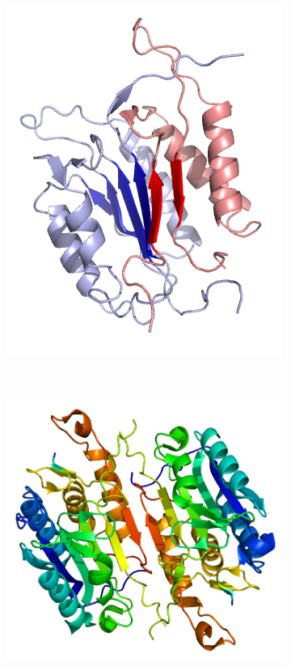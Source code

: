 \documentclass[pdftex,12pt,a4paper]{report}
\begin{document}
\begin{figure}[H]

\centering

\begin{subfigure}{0.4\textwidth}
  \centering
  \includegraphics[width=\textwidth]{images/caspase3_dimer}
  \caption{}
  \label{fig:caspase3_dimer}
\end{subfigure}%
~
\begin{subfigure}{0.4\textwidth}
  \centering
  \includegraphics[width=\textwidth]{images/caspase7_dimer}
  \caption{}
  \label{fig:caspase37_dimer}
\end{subfigure}%


\end{figure}
\end{document}
